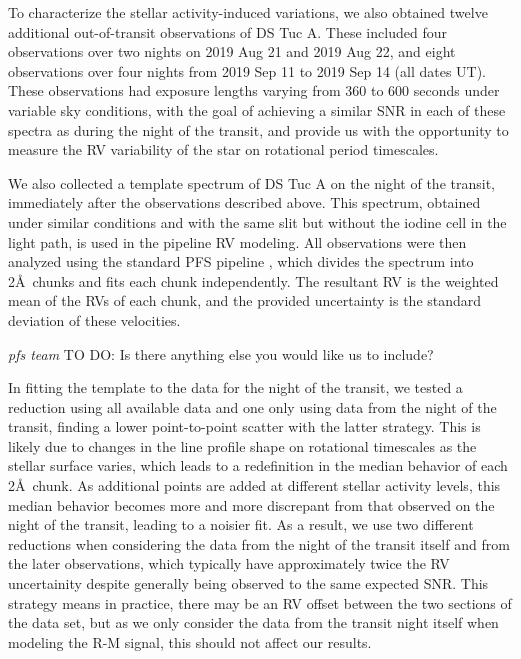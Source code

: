 \documentclass[twocolumn]{aastex63}
\newcommand{\todo}[3]{{\color{#2} \emph{#1} TO DO: #3}}
\begin{document}
To characterize the stellar activity-induced variations, we also obtained twelve additional out-of-transit observations of DS Tuc A. These included four observations over two nights on 2019 Aug 21 and 2019 Aug 22, and eight observations over four nights from 2019 Sep 11 to 2019 Sep 14 (all dates UT).
These observations had exposure lengths varying from 360 to 600 seconds under variable sky conditions, with the goal of achieving a similar SNR in each of these spectra as during the night of the transit, and provide us with the opportunity to measure the RV variability of the star on rotational period timescales.

We also collected a template spectrum of DS Tuc A on the night of the transit, immediately after the observations described above.
This spectrum, obtained under similar conditions and with the same slit but without the iodine cell in the light path, is used in the pipeline RV modeling.
All observations were then analyzed using the standard PFS pipeline \citep{Butler96}, which divides the spectrum into 2\AA\ chunks and fits each chunk independently.
The resultant RV is the weighted mean of the RVs of each chunk, and the provided uncertainty is the standard deviation of these velocities.



\todo{pfs team}{red}{Is there anything else you would like us to include?}

In fitting the template to the data for the night of the transit, we tested a reduction using all available data and one only using data from the night of the transit, finding a lower point-to-point scatter with the latter strategy. 
This is likely due to changes in the line profile shape on rotational timescales as the stellar surface varies, which leads to a redefinition in the median behavior of each 2\AA\ chunk.
As additional points are added at different stellar activity levels, this median behavior becomes more and more discrepant from that observed on the night of the transit, leading to a noisier fit. 
As a result, we use two different reductions when considering the data from the night of the transit itself and from the later observations, which typically have approximately twice the RV uncertainity despite generally being observed to the same expected SNR.
This strategy means in practice, there may be an RV offset between the two sections of the data set, but as we only consider the data from the transit night itself when modeling the R-M signal, this should not affect our results.
\end{document}
